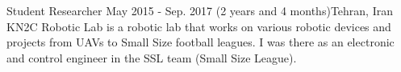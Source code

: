 \resumeSubheadingReza
{Student Researcher}{}
{May 2015 - Sep. 2017 (2 years and 4 months)}{Tehran, Iran}
{KN2C Robotic Lab is a robotic lab that works on various robotic devices and projects from UAVs to Small Size football leagues. I was there as an electronic and control engineer in the SSL team (Small Size League).}
